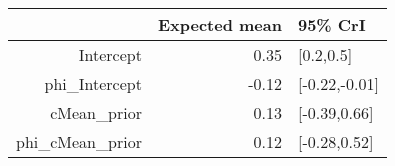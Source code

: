 \begin{tabular}{rrl}
  \hline
 & Expected mean & 95\% CrI \\ 
  \hline
Intercept & 0.35 & [0.2,0.5] \\ 
  phi\_Intercept & -0.12 & [-0.22,-0.01] \\ 
  cMean\_prior & 0.13 & [-0.39,0.66] \\ 
  phi\_cMean\_prior & 0.12 & [-0.28,0.52] \\ 
   \hline
\end{tabular}

